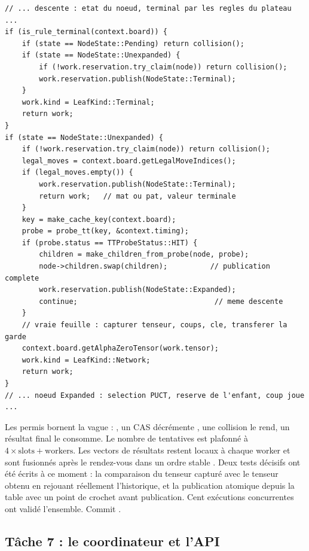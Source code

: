 \begin{lstlisting}[caption={Extrait de la boucle de collecte. Le terminal est
test\'e avant toute lecture de table ; le CAS vers \code{Pending} est la seule
garantie de propri\'et\'e ; un succ\`es de table publie les enfants et
poursuit la descente, comme le faisait \code{select\_leaf}.},
label={lst:collecte}]
// ... descente : etat du noeud, terminal par les regles du plateau ...
if (is_rule_terminal(context.board)) {
    if (state == NodeState::Pending) return collision();
    if (state == NodeState::Unexpanded) {
        if (!work.reservation.try_claim(node)) return collision();
        work.reservation.publish(NodeState::Terminal);
    }
    work.kind = LeafKind::Terminal;
    return work;
}
if (state == NodeState::Unexpanded) {
    if (!work.reservation.try_claim(node)) return collision();
    legal_moves = context.board.getLegalMoveIndices();
    if (legal_moves.empty()) {
        work.reservation.publish(NodeState::Terminal);
        return work;   // mat ou pat, valeur terminale
    }
    key = make_cache_key(context.board);
    probe = probe_tt(key, &context.timing);
    if (probe.status == TTProbeStatus::HIT) {
        children = make_children_from_probe(node, probe);
        node->children.swap(children);          // publication complete
        work.reservation.publish(NodeState::Expanded);
        continue;                                // meme descente
    }
    // vraie feuille : capturer tenseur, coups, cle, transferer la garde
    context.board.getAlphaZeroTensor(work.tensor);
    work.kind = LeafKind::Network;
    return work;
}
// ... noeud Expanded : selection PUCT, reserve de l'enfant, coup joue ...
\end{lstlisting}

Les permis bornent la vague : , un CAS
d\'ecr\'emente , une collision le rend, un r\'esultat final le
consomme. Le nombre de tentatives est plafonn\'e \`a $4 \times \text{slots} +
\text{workers}$. Les vectors de r\'esultats restent locaux \`a chaque worker
et sont fusionn\'es apr\`es le rendez-vous dans un ordre stable
. Deux tests d\'ecisifs ont \'et\'e \'ecrits \`a ce
moment : la comparaison du tenseur captur\'e avec le tenseur obtenu en
rejouant r\'eellement l'historique, et la publication atomique depuis la
table avec un point de crochet avant publication. Cent ex\'ecutions
concurrentes ont valid\'e l'ensemble. Commit .

\subsection{T\^ache 7 : le coordinateur et l'API}
\label{sec:t7}

